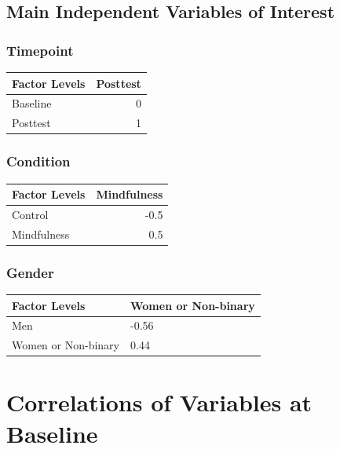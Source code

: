 \documentclass[
  letterpaper,
  DIV=11,
  numbers=noendperiod]{scrreprt}
\begin{document}
\section{Main Independent Variables of
Interest}\label{main-independent-variables-of-interest}

\subsection{Timepoint}\label{timepoint}

\begin{longtable}[]{@{}lr@{}}
\toprule\noalign{}
Factor Levels & Posttest \\
\midrule\noalign{}
\endhead
\bottomrule\noalign{}
\endlastfoot
Baseline & 0 \\
Posttest & 1 \\
\end{longtable}

\subsection{Condition}\label{condition}

\begin{longtable}[]{@{}lr@{}}
\toprule\noalign{}
Factor Levels & Mindfulness \\
\midrule\noalign{}
\endhead
\bottomrule\noalign{}
\endlastfoot
Control & -0.5 \\
Mindfulness & 0.5 \\
\end{longtable}

\subsection{Gender}\label{gender}

\begin{longtable}[]{@{}ll@{}}
\toprule\noalign{}
Factor Levels & Women or Non-binary \\
\midrule\noalign{}
\endhead
\bottomrule\noalign{}
\endlastfoot
Men & -0.56 \\
Women or Non-binary & 0.44 \\
\end{longtable}

\chapter{Correlations of Variables at
Baseline}\label{correlations-of-variables-at-baseline}
\end{document}
